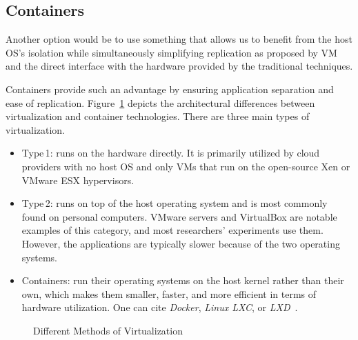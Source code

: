 \subsection{Containers}
Another option would be to use something that allows us to benefit from the host OS's isolation while simultaneously simplifying replication as proposed by VM and the direct interface with the hardware provided by the traditional techniques.

Containers provide such an advantage by ensuring application separation and ease of replication.
Figure~\ref{environement:virtualization_technique} depicts the architectural differences between virtualization and container technologies. There are three main types of virtualization.
\begin{itemize}
    \item \textsf{Type\,1}: runs on the hardware directly.
          It is primarily utilized by cloud providers with no host OS and only VMs that run on the open-source Xen or VMware ESX hypervisors.

    \item \textsf{Type\,2}: runs on top of the host operating system and is most commonly found on personal computers. VMware servers and VirtualBox are notable examples of this category, and most researchers' experiments use them.
          However, the applications are typically slower because of the two operating systems.

    \item \textsf{Containers}: run their operating systems on the host kernel rather than their own, which makes them smaller, faster, and more efficient in terms of hardware utilization. One can cite \emph{Docker}, \emph{Linux LXC}, or \emph{LXD}~\cite{abuabdo_virtualization_2019}.
\end{itemize}


\begin{figure}
    \caption{Different Methods of Virtualization}\label{environement:virtualization_technique}
\end{figure}


